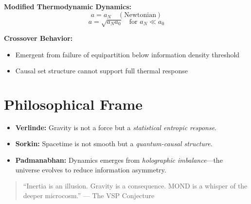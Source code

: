 \documentclass[12pt]{article}
\begin{document}
\textbf{Modified Thermodynamic Dynamics:}
\[
a = a_N \quad (\text{Newtonian})
\]
\[
a = \sqrt{a_N a_0} \quad \text{for } a_N \ll a_0
\]

\textbf{Crossover Behavior:}
\begin{itemize}
    \item Emergent from failure of equipartition below information density threshold
    \item Causal set structure cannot support full thermal response
\end{itemize}

\section*{Philosophical Frame}

\begin{itemize}
    \item \textbf{Verlinde:} Gravity is not a force but a \textit{statistical entropic response}.
    \item \textbf{Sorkin:} Spacetime is not smooth but a \textit{quantum-causal structure}.
    \item \textbf{Padmanabhan:} Dynamics emerges from \textit{holographic imbalance}—the universe evolves to reduce information asymmetry.
\end{itemize}

\begin{quote}
“Inertia is an illusion. Gravity is a consequence. MOND is a whisper of the deeper microcosm.”  
— The VSP Conjecture
\end{quote}
\end{document}
